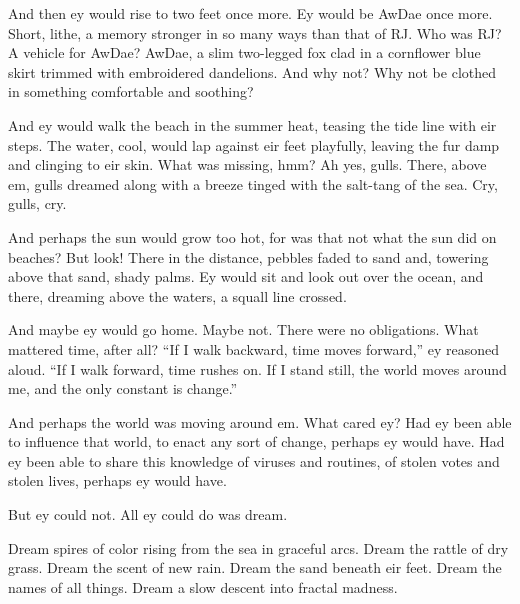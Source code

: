 And then ey would rise to two feet once more. Ey would be AwDae once more. Short, lithe, a memory stronger in so many ways than that of RJ. Who was RJ? A vehicle for AwDae? AwDae, a slim two-legged fox clad in a cornflower blue skirt trimmed with embroidered dandelions. And why not? Why not be clothed in something comfortable and soothing?

And ey would walk the beach in the summer heat, teasing the tide line with eir steps. The water, cool, would lap against eir feet playfully, leaving the fur damp and clinging to eir skin. What was missing, hmm? Ah yes, gulls. There, above em, gulls dreamed along with a breeze tinged with the salt-tang of the sea. Cry, gulls, cry.

And perhaps the sun would grow too hot, for was that not what the sun did on beaches? But look! There in the distance, pebbles faded to sand and, towering above that sand, shady palms. Ey would sit and look out over the ocean, and there, dreaming above the waters, a squall line crossed.

And maybe ey would go home. Maybe not. There were no obligations. What mattered time, after all? ``If I walk backward, time moves forward,'' ey reasoned aloud. ``If I walk forward, time rushes on. If I stand still, the world moves around me, and the only constant is change.''

And perhaps the world was moving around em. What cared ey? Had ey been able to influence that world, to enact any sort of change, perhaps ey would have. Had ey been able to share this knowledge of viruses and routines, of stolen votes and stolen lives, perhaps ey would have.

But ey could not. All ey could do was dream.

Dream spires of color rising from the sea in graceful arcs. Dream the rattle of dry grass. Dream the scent of new rain. Dream the sand beneath eir feet. Dream the names of all things. Dream a slow descent into fractal madness.
